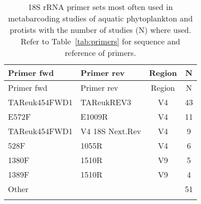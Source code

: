 \begin{longtable}{llcc}
\caption{18S rRNA primer sets most often used in metabarcoding studies of aquatic phytoplankton and protists with the number of studies (N) where used.  Refer to Table~\ref{tab:primers} for sequence and reference of primers.} \\ 
  \hline
  Primer fwd & Primer rev & Region & N \\
 \endfirsthead 
 \hline 
 Primer fwd & Primer rev & Region & N \\
 \hline 
 \endhead 
 \hline 
 \endfoot 
  \endlastfoot 
 \hline
TAReuk454FWD1 & TAReukREV3 & V4 & 43 \\ 
  E572F & E1009R & V4 & 11 \\ 
  TAReuk454FWD1 & V4 18S Next.Rev & V4 & 9 \\ 
  528F & 1055R & V4 & 6 \\ 
  1380F & 1510R & V9 & 5 \\ 
  1389F & 1510R & V9 & 4 \\ 
  Other &  &  & 51 \\ 
   \hline
\hline
\label{tab:primer_sets}
\end{longtable}
